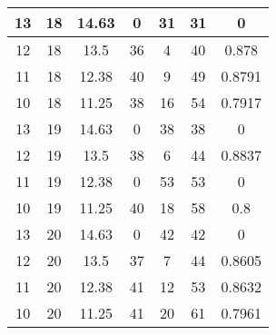 \documentclass[letterpaper, 12pt]{article}
\begin{document}
\begin{longtable}{|c|c|c|c|c|c|c|}
\hline
13 & 18 & 14.63 & 0 & 31 & 31 & 0 \\
\hline
12 & 18 & 13.5 & 36 & 4 & 40 & 0.878 \\
\hline
11 & 18 & 12.38 & 40 & 9 & 49 & 0.8791 \\
\hline
10 & 18 & 11.25 & 38 & 16 & 54 & 0.7917 \\
\hline
13 & 19 & 14.63 & 0 & 38 & 38 & 0 \\
\hline
12 & 19 & 13.5 & 38 & 6 & 44 & 0.8837 \\
\hline
11 & 19 & 12.38 & 0 & 53 & 53 & 0 \\
\hline
10 & 19 & 11.25 & 40 & 18 & 58 & 0.8 \\
\hline
13 & 20 & 14.63 & 0 & 42 & 42 & 0 \\
\hline
12 & 20 & 13.5 & 37 & 7 & 44 & 0.8605 \\
\hline
11 & 20 & 12.38 & 41 & 12 & 53 & 0.8632 \\
\hline
10 & 20 & 11.25 & 41 & 20 & 61 & 0.7961 \\
\hline
\end{longtable}
\end{document}
